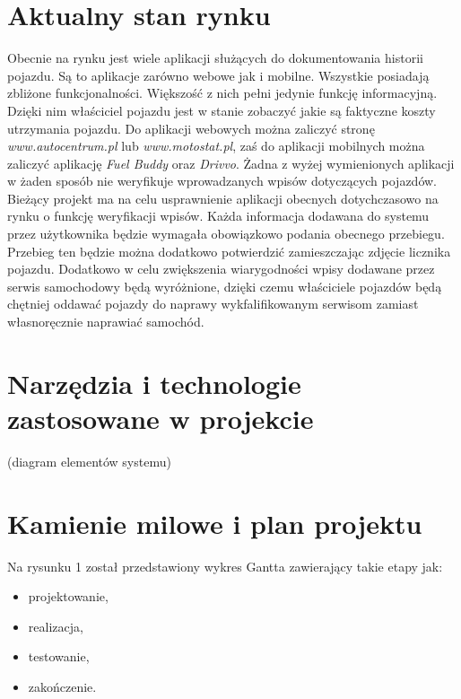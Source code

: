\documentclass[12pt]{article}
\begin{document}
\newpage
\section{Aktualny stan rynku }
	
Obecnie na rynku jest wiele aplikacji służących do dokumentowania historii pojazdu. Są to aplikacje zarówno webowe jak i mobilne. Wszystkie posiadają zbliżone funkcjonalności. Większość z nich pełni jedynie funkcję informacyjną. Dzięki nim właściciel pojazdu jest w stanie zobaczyć jakie są faktyczne koszty utrzymania pojazdu. Do aplikacji webowych można zaliczyć stronę \textit{www.autocentrum.pl} lub \textit{www.motostat.pl}, zaś do aplikacji mobilnych można zaliczyć aplikację \textit{Fuel Buddy} oraz \textit{Drivvo}. Żadna z wyżej wymienionych aplikacji w żaden sposób nie weryfikuje wprowadzanych wpisów dotyczących pojazdów. Bieżący projekt ma na celu usprawnienie aplikacji obecnych dotychczasowo na rynku o funkcję weryfikacji wpisów. Każda informacja dodawana do systemu przez użytkownika będzie wymagała obowiązkowo podania obecnego przebiegu. Przebieg ten będzie można dodatkowo potwierdzić zamieszczając zdjęcie licznika pojazdu. Dodatkowo w celu zwiększenia wiarygodności wpisy dodawane przez serwis samochodowy będą wyróżnione, dzięki czemu właściciele pojazdów będą chętniej oddawać pojazdy do naprawy wykfalifikowanym serwisom zamiast własnoręcznie naprawiać samochód. 


\newpage
\section{Narzędzia i technologie zastosowane w projekcie}
(diagram elementów systemu)


\newpage
\section{Kamienie milowe i plan projektu}

\noindent Na rysunku 1 został przedstawiony wykres Gantta zawierający takie etapy jak: 
\begin{itemize}
\item projektowanie,
\item realizacja,
\item testowanie,
\item zakończenie.
\end{itemize}
\end{document}
